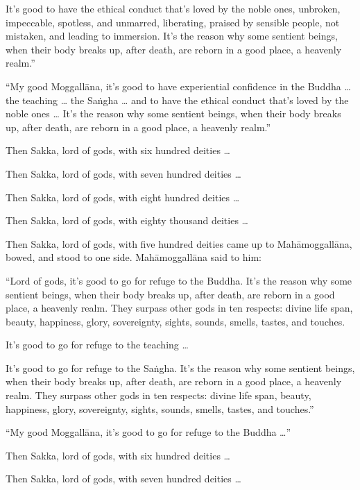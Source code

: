 \documentclass[12pt,openany]{book}%
\begin{document}
It’s good to have the ethical conduct that’s loved by the noble ones, unbroken, impeccable, spotless, and unmarred, liberating, praised by sensible people, not mistaken, and leading to immersion. It’s the reason why some sentient beings, when their body breaks up, after death, are reborn in a good place, a heavenly realm.” 

“My good \textsanskrit{Moggallāna}, it’s good to have experiential confidence in the Buddha … the teaching … the \textsanskrit{Saṅgha} … and to have the ethical conduct that’s loved by the noble ones … It’s the reason why some sentient beings, when their body breaks up, after death, are reborn in a good place, a heavenly realm.” 

Then Sakka, lord of gods, with six hundred deities … 

Then Sakka, lord of gods, with seven hundred deities … 

Then Sakka, lord of gods, with eight hundred deities … 

Then Sakka, lord of gods, with eighty thousand deities … 

Then Sakka, lord of gods, with five hundred deities came up to \textsanskrit{Mahāmoggallāna}, bowed, and stood to one side. \textsanskrit{Mahāmoggallāna} said to him: 

“Lord of gods, it’s good to go for refuge to the Buddha. It’s the reason why some sentient beings, when their body breaks up, after death, are reborn in a good place, a heavenly realm. They surpass other gods in ten respects: divine life span, beauty, happiness, glory, sovereignty, sights, sounds, smells, tastes, and touches. 

It’s good to go for refuge to the teaching … 

It’s good to go for refuge to the \textsanskrit{Saṅgha}. It’s the reason why some sentient beings, when their body breaks up, after death, are reborn in a good place, a heavenly realm. They surpass other gods in ten respects: divine life span, beauty, happiness, glory, sovereignty, sights, sounds, smells, tastes, and touches.” 

“My good \textsanskrit{Moggallāna}, it’s good to go for refuge to the Buddha …” 

Then Sakka, lord of gods, with six hundred deities … 

Then Sakka, lord of gods, with seven hundred deities … 
\end{document}
